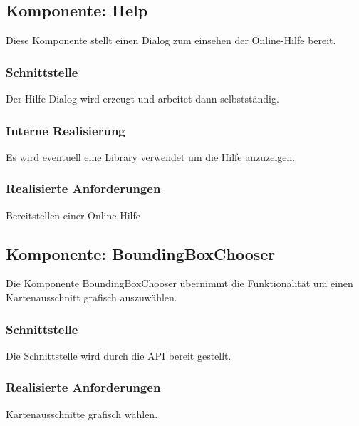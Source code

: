 \documentclass[a4paper,12pt]{scrartcl}
\begin{document}
\subsection{Komponente: Help}
Diese Komponente stellt einen Dialog zum einsehen der Online-Hilfe bereit.
\subsubsection{Schnittstelle}
Der Hilfe Dialog wird erzeugt und arbeitet dann selbstständig.
\subsubsection{Interne Realisierung}
Es wird eventuell eine Library verwendet um die Hilfe anzuzeigen.
\subsubsection{Realisierte Anforderungen}
Bereitstellen einer Online-Hilfe
\subsection{Komponente: BoundingBoxChooser}
Die Komponente BoundingBoxChooser übernimmt die Funktionalität um einen Kartenausschnitt grafisch auszuwählen.
\subsubsection{Schnittstelle}
Die Schnittstelle wird durch die API bereit gestellt.
\subsubsection{Realisierte Anforderungen}
Kartenausschnitte grafisch wählen.
\end{document}
